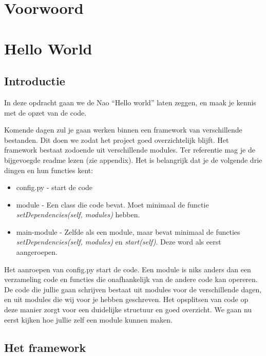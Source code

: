 \documentclass[a4paper, twoside]{article}
\begin{document}
\cleardoublepage

\section*{Voorwoord}

\cleardoublepage


\tableofcontents{}

\cleardoublepage

\pagestyle{plain}
\setcounter{page}{1}
\section{Hello World}
\subsection{Introductie}
In deze opdracht gaan we de Nao ``Hello world'' laten zeggen, en maak je kennis met de opzet van de code.

Komende dagen zul je gaan werken binnen een framework van verschillende bestanden. Dit doen we zodat het project goed overzichtelijk blijft. Het framework bestaat zodoende uit verschillende modules. Ter referentie mag je de bijgevoegde readme lezen (zie appendix). Het is belangrijk dat je de volgende drie dingen en hun functies kent:
\begin{itemize}
\item config.py - start de code
\item module - Een class die code bevat. Moet minimaal de functie \textit{setDependencies(self, modules)} hebben.
\item main-module - Zelfde als een module, maar bevat minimaal de functies \textit{setDependencies(self, modules)} en \textit{start(self)}. Deze word als eerst aangeroepen.
\end{itemize}

Het aanroepen van config.py start de code. Een module is niks anders dan een verzameling code en functies die onafhankelijk van de andere code kan opereren. De code die jullie gaan schrijven bestaat uit modules voor de verschillende dagen, en uit modules die wij voor je hebben geschreven. Het opsplitsen van code op deze manier zorgt voor een duidelijke structuur en goed overzicht. We gaan nu eerst kijken hoe jullie zelf een module kunnen maken.

\subsection{Het framework}
\end{document}
